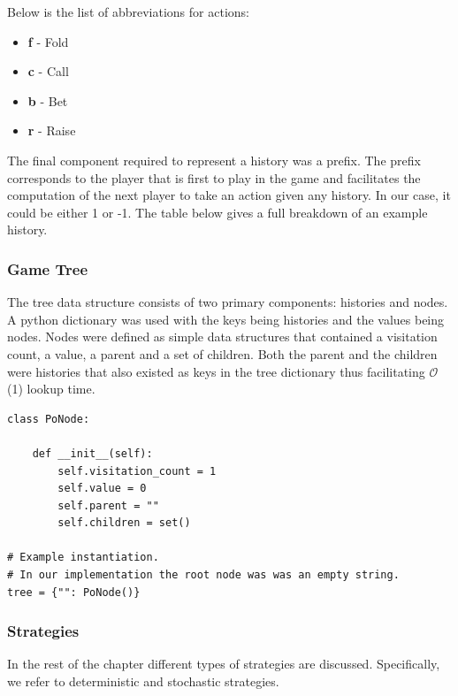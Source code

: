 Below is the list of abbreviations for actions:
\begin{itemize}
    \item \textbf{f} - Fold
    \item \textbf{c} - Call
    \item \textbf{b} - Bet
    \item \textbf{r} - Raise
\end{itemize}

The final component required to represent a history was a prefix.
The prefix corresponds to the player that is first to play in the game and facilitates the computation of
the next player to take an action given any history.
In our case, it could be either 1 or -1.
The table below gives a full breakdown of an example history.


\subsubsection{Game Tree}
The tree data structure consists of two primary components: histories and nodes.
A python dictionary was used with the keys being histories and the values being nodes.
Nodes were defined as simple data structures that contained a visitation count, a value,
a parent and a set of children.
Both the parent and the children were histories that also existed as keys in the
tree dictionary thus facilitating $\mathcal{O}$(1) lookup time.

\begin{lstlisting}[style=Python]
class PoNode:

    def __init__(self):
        self.visitation_count = 1
        self.value = 0
        self.parent = ""
        self.children = set()

# Example instantiation.
# In our implementation the root node was was an empty string.
tree = {"": PoNode()}
\end{lstlisting}

\subsubsection{Strategies}
In the rest of the chapter different types of strategies are discussed.
Specifically, we refer to deterministic and stochastic strategies.


